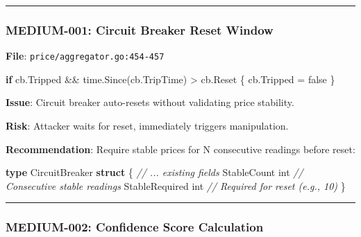 \documentclass[
]{article}
\newenvironment{Shaded}{}{}
\newcommand{\CommentTok}[1]{\textcolor[rgb]{0.38,0.63,0.69}{\textit{#1}}}
\newcommand{\ControlFlowTok}[1]{\textcolor[rgb]{0.00,0.44,0.13}{\textbf{#1}}}
\newcommand{\DataTypeTok}[1]{\textcolor[rgb]{0.56,0.13,0.00}{#1}}
\newcommand{\KeywordTok}[1]{\textcolor[rgb]{0.00,0.44,0.13}{\textbf{#1}}}
\newcommand{\NormalTok}[1]{#1}
\newcommand{\OperatorTok}[1]{\textcolor[rgb]{0.40,0.40,0.40}{#1}}
\newcommand{\OtherTok}[1]{\textcolor[rgb]{0.00,0.44,0.13}{#1}}
\begin{document}
\begin{center}\rule{0.5\linewidth}{0.5pt}\end{center}

\subsubsection{MEDIUM-001: Circuit Breaker Reset
Window}\label{medium-001-circuit-breaker-reset-window}

\textbf{File}: \texttt{price/aggregator.go:454-457}

\begin{Shaded}
\begin{Highlighting}[]
\ControlFlowTok{if}\NormalTok{ cb}\OperatorTok{.}\NormalTok{Tripped }\OperatorTok{\&\&}\NormalTok{ time}\OperatorTok{.}\NormalTok{Since}\OperatorTok{(}\NormalTok{cb}\OperatorTok{.}\NormalTok{TripTime}\OperatorTok{)} \OperatorTok{\textgreater{}}\NormalTok{ cb}\OperatorTok{.}\NormalTok{Reset }\OperatorTok{\{}
\NormalTok{    cb}\OperatorTok{.}\NormalTok{Tripped }\OperatorTok{=} \OtherTok{false}
\OperatorTok{\}}
\end{Highlighting}
\end{Shaded}

\textbf{Issue}: Circuit breaker auto-resets without validating price
stability.

\textbf{Risk}: Attacker waits for reset, immediately triggers
manipulation.

\textbf{Recommendation}: Require stable prices for N consecutive
readings before reset:

\begin{Shaded}
\begin{Highlighting}[]
\KeywordTok{type}\NormalTok{ CircuitBreaker }\KeywordTok{struct} \OperatorTok{\{}
    \CommentTok{// ... existing fields}
\NormalTok{    StableCount    }\DataTypeTok{int}  \CommentTok{// Consecutive stable readings}
\NormalTok{    StableRequired }\DataTypeTok{int}  \CommentTok{// Required for reset (e.g., 10)}
\OperatorTok{\}}
\end{Highlighting}
\end{Shaded}

\begin{center}\rule{0.5\linewidth}{0.5pt}\end{center}

\subsubsection{MEDIUM-002: Confidence Score
Calculation}\label{medium-002-confidence-score-calculation}
\end{document}
